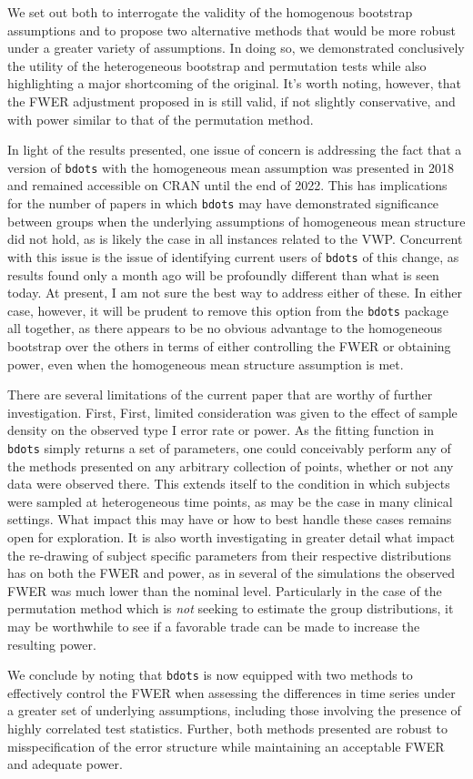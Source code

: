 \documentclass{article}
\newcommand{\xt}{\texttt}
\begin{document}
We set out both to interrogate the validity of the homogenous bootstrap assumptions and to propose two alternative methods that would be more robust under a greater variety of assumptions. In doing so, we demonstrated conclusively the utility of the heterogeneous bootstrap and permutation tests while also highlighting a major shortcoming of the original. It's worth noting, however, that the FWER adjustment proposed in \cite{oleson2017detecting} is still valid, if not slightly conservative, and with power similar to that of the permutation method. 

In light of the results presented, one issue of concern is addressing the fact that a version of \xt{bdots} with the homogeneous mean assumption was presented in 2018 and remained accessible on CRAN until the end of 2022. This has implications for the number of papers in which \xt{bdots} may have demonstrated significance between groups when the underlying assumptions of homogeneous mean structure did not hold, as is likely the case in all instances related to the VWP. Concurrent with this issue is the issue of identifying current users of \xt{bdots} of this change, as results found only a month ago will be profoundly different than what is seen today. At present, I am not sure the best way to address either of these. In either case, however, it will be prudent to remove this option from the \xt{bdots} package all together, as there appears to be no obvious advantage to the homogeneous bootstrap over the others in terms of either controlling the FWER or obtaining power, even when the homogeneous mean structure assumption is met.

There are several limitations of the current paper that are worthy of further investigation. First, First, limited consideration was given to the effect of sample density on the observed type I error rate or power. As the fitting function in \xt{bdots} simply returns a set of parameters, one could conceivably perform any of the methods presented on any arbitrary collection of points, whether or not any data were observed there. This extends itself to the condition in which subjects were sampled at heterogeneous time points, as may be the case in many clinical settings. What impact this may have or how to best handle these cases remains open for exploration. It is also worth investigating in greater detail what impact the re-drawing of subject specific parameters from their respective distributions has on both the FWER and power, as in several of the simulations the observed FWER was much lower than the nominal level. Particularly in the case of the permutation method which is \textit{not} seeking to estimate the group distributions, it may be worthwhile to see if a favorable trade can be made to increase the resulting power.

We conclude by noting that \xt{bdots} is now equipped with two methods to effectively control the FWER when assessing the differences in time series under a greater set of underlying assumptions, including those involving the presence of highly correlated test statistics. Further, both methods presented are robust to misspecification of the error structure while maintaining an acceptable FWER and adequate power. 
\end{document}
